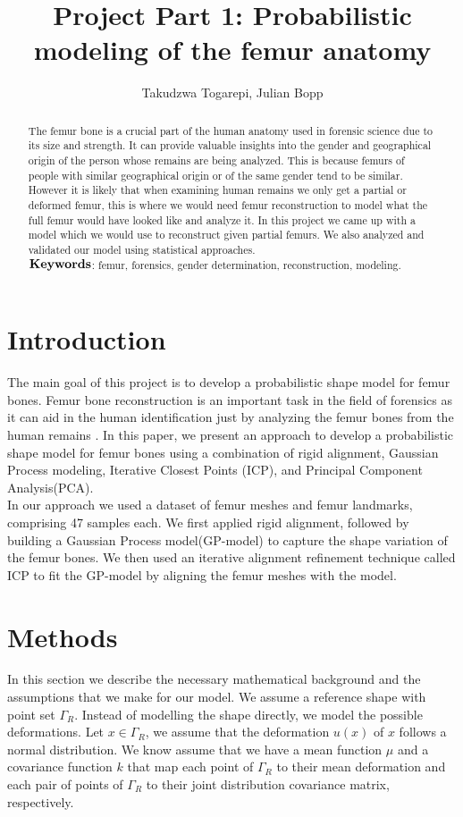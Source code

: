 \documentclass[10pt]{article}
\author{Takudzwa Togarepi, Julian Bopp }
\title{Project Part 1: Probabilistic modeling of the femur anatomy}
\theoremstyle{definition}
\begin{document}
\maketitle

\begin{abstract}
\noindent
The femur bone is a crucial part of the human anatomy used in forensic science due to its size and strength. It can provide valuable insights into the gender and geographical origin of the person whose remains are being analyzed. This is because femurs of people with similar geographical origin or of the same gender tend to be similar. However it is likely that when examining human remains we only get a partial or deformed femur, this is where we would need femur reconstruction to model what the full femur would have looked like and analyze it. In this project we came up with a model which we would use to reconstruct given partial femurs. We also analyzed and validated our model using statistical approaches.\\

\noindent
$\bold{Keywords}$: femur, forensics, gender determination, reconstruction, modeling.
\end{abstract}
\section{Introduction}
The main goal of this project is to develop a probabilistic shape model for femur bones.
Femur bone reconstruction is an important task in the field of forensics as it can aid in the human identification just by analyzing the femur bones from the human remains . In this paper, we present an approach to develop a probabilistic shape model for femur bones using a combination of rigid alignment, Gaussian Process modeling, Iterative Closest Points (ICP), and Principal Component Analysis(PCA).\\

\noindent
In our approach we used a dataset of femur meshes and femur landmarks, comprising 47 samples each. We first applied rigid alignment, followed by building a Gaussian Process model(GP-model) to capture the shape variation of the femur bones. We then used an iterative alignment refinement technique called ICP to fit the GP-model by aligning the femur meshes with the model.\\

\section{Methods}
In this section we describe the necessary mathematical background and the assumptions that we make for our model. We assume a reference shape with point set $\Gamma_R$. Instead of modelling the shape directly, we model the possible deformations. Let $x\in\Gamma_R$, we assume that the deformation $u(x)$ of $x$ follows a normal distribution. We know assume that we have a mean function $\mu$ and a covariance function $k$ that map each point of $\Gamma_R$ to their mean deformation and each pair of points of $\Gamma_R$ to their joint distribution covariance matrix, respectively.
\end{document}
